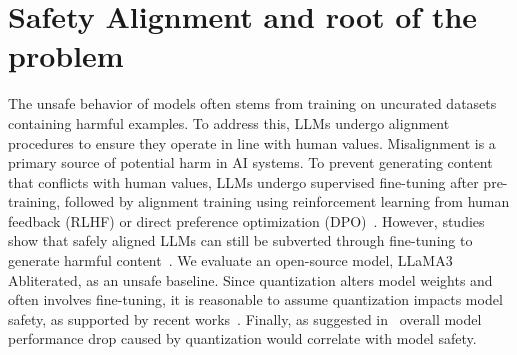     


\section{Safety Alignment and root of the problem}
The unsafe behavior of models often stems from training on uncurated datasets containing harmful examples. To address this, LLMs undergo alignment procedures to ensure they operate in line with human values. Misalignment is a primary source of potential harm in AI systems. To prevent generating content that conflicts with human values, LLMs undergo supervised fine-tuning after pre-training, followed by alignment training using reinforcement learning from human feedback (RLHF)\cite{10.5555/3600270.3602281} or direct preference optimization (DPO)~\cite{Rafailov2023DirectPO}. However, studies show that safely aligned LLMs can still be subverted through fine-tuning to generate harmful content~\cite{yang2023shadow, lermen2023lora}. We evaluate an open-source model, LLaMA3 Abliterated, as an unsafe baseline. Since quantization alters model weights and often involves fine-tuning, it is reasonable to assume quantization impacts model safety, as supported by recent works~\cite{liu2024evaluating, belkhiter2024harmlevelbench}. Finally, as suggested in~\cite{ren2024safetywashing} overall model performance drop caused by quantization would correlate with model safety.